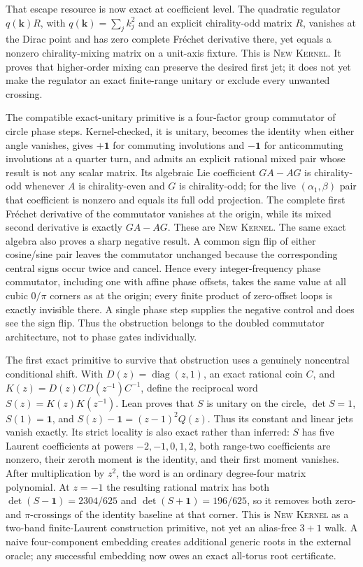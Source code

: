 \documentclass[11pt]{article}
\newcommand{\Kernel}{\textcolor{kernelcolor}{\textsc{Kernel}}}
\newcommand{\NewResult}{\textsc{New}}
\newcommand{\id}{\mathbf{1}}
\begin{document}
That escape resource is now exact at coefficient level.  The quadratic
regulator $q(\mathbf k)R$, with $q(\mathbf k)=\sum_j k_j^2$ and an explicit
chirality-odd matrix $R$, vanishes at the Dirac point and has zero complete
Fr\'echet derivative there, yet equals a nonzero chirality-mixing matrix on a
unit-axis fixture.  This is \NewResult{} \Kernel{}.  It proves that higher-order
mixing can preserve the desired first jet; it does not yet make the regulator
an exact finite-range unitary or exclude every unwanted crossing.

The compatible exact-unitary primitive is a four-factor group commutator of
circle phase steps.  Kernel-checked, it is unitary, becomes the identity when
either angle vanishes, gives $+\id$ for commuting involutions and $-\id$ for
anticommuting involutions at a quarter turn, and admits an explicit rational
mixed pair whose result is not any scalar matrix.  Its algebraic Lie
coefficient $GA-AG$ is chirality-odd whenever $A$ is chirality-even and $G$ is
chirality-odd; for the live $(\alpha_1,\beta)$ pair that coefficient is
nonzero and equals its full odd projection.  The complete first Fr\'echet
derivative of the commutator vanishes at the origin, while its mixed second
derivative is exactly $GA-AG$.  These are \NewResult{} \Kernel{}.  The same
exact algebra also proves a sharp negative result.  A common sign flip of either
cosine/sine pair leaves the commutator unchanged because the corresponding
central signs occur twice and cancel.  Hence every integer-frequency phase
commutator, including one with affine phase offsets, takes the same value at
all cubic $0/\pi$ corners as at the origin; every finite product of zero-offset
loops is exactly invisible there.  A single phase step supplies the negative
control and does see the sign flip.  Thus the obstruction belongs to the
doubled commutator architecture, not to phase gates individually.

The first exact primitive to survive that obstruction uses a genuinely
noncentral conditional shift.  With
$D(z)=\operatorname{diag}(z,1)$, an exact rational coin $C$, and
$K(z)=D(z)CD(z^{-1})C^{-1}$, define the reciprocal word
$S(z)=K(z)K(z^{-1})$.  Lean proves that $S$ is unitary on the circle,
$\det S=1$, $S(1)=\id$, and
$S(z)-\id=(z-1)^2Q(z)$.  Thus its constant and linear jets vanish exactly.
Its strict locality is also exact rather than inferred: $S$ has five Laurent
coefficients at powers $-2,-1,0,1,2$, both range-two coefficients are nonzero,
their zeroth moment is the identity, and their first moment vanishes.  After
multiplication by $z^2$, the word is an ordinary degree-four matrix polynomial.
At $z=-1$ the resulting rational matrix has both
$\det(S-\id)=2304/625$ and $\det(S+\id)=196/625$, so it removes both
zero- and $\pi$-crossings of the identity baseline at that corner.  This is
\NewResult{} \Kernel{} as a two-band finite-Laurent construction primitive,
not yet an alias-free $3+1$ walk.  A naive four-component embedding creates
additional generic roots in the external oracle; any successful embedding now
owes an exact all-torus root certificate.
\end{document}
